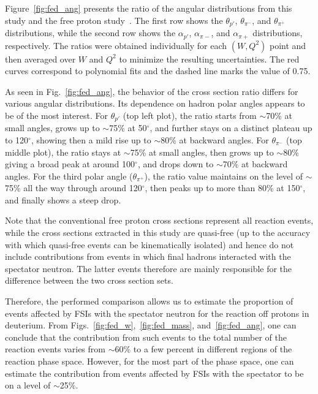 \documentclass[prc,twocolumn,superscriptaddress,showpacs,amssymb,amsmath,amsfonts,aps,nofootinbib]{revtex4-1}
\begin{document}
Figure~\ref{fig:fed_ang} presents the ratio of the angular distributions from this study and the free proton study~\cite{Fed_an_note:2017,Fed_paper_2018}. The first row shows the $\theta_{p'}$, $\theta_{\pi^{-}}$, and $\theta_{\pi^{+}}$ distributions, while the second row shows the $\alpha_{p'}$, $\alpha_{\pi{-}}$, and $\alpha_{\pi{+}}$ distributions, respectively. The ratios were obtained individually for each $(W,Q^{2})$ point and then averaged over $W$ and $Q^{2}$ to minimize the resulting uncertainties. The red curves correspond to polynomial fits and the dashed line marks the value of 0.75.

As seen in Fig.\!~\ref{fig:fed_ang}, the behavior of the cross section ratio differs for various angular distributions. Its dependence on hadron polar angles appears to be of the most interest. For $\theta_{p'}$ (top left plot), the ratio starts from $\sim$70\% at small angles, grows up to $\sim$75\% at 50$^{\circ}$, and further stays on a distinct plateau up to 120$^{\circ}$, showing then a mild rise up to $\sim$80\% at backward angles. For $\theta_{\pi^{-}}$ (top middle plot), the ratio stays at $\sim$75\% at small angles, then grows up to $\sim$80\% giving a broad peak at around 100$^{\circ}$, and drops down to $\sim$70\% at backward angles. For the third polar angle ($\theta_{\pi^{+}}$), the ratio value maintains on the level of $\sim$75\% all the way through around 120$^{\circ}$, then peaks up to more than 80\% at 150$^{\circ}$, and finally shows a steep drop.



Note that the conventional free proton cross sections represent all reaction events, while the cross sections extracted in this study are quasi-free (up to the accuracy with which quasi-free events can be kinematically isolated) and hence do not include contributions from events in which final hadrons interacted with the spectator neutron. The latter events therefore are mainly responsible for the difference between the two cross section sets. 

Therefore, the performed comparison allows us to estimate the proportion of events affected by FSIs with the spectator neutron for the reaction off protons in deuterium. From Figs.~\ref{fig:fed_w},~\ref{fig:fed_mass}, and~\ref{fig:fed_ang}, one can conclude that the contribution from such events to the total number of the reaction events varies from $\sim$60\% to a few percent in different regions of the reaction phase space. However, for the most part of the phase space, one can estimate the contribution from events affected by FSIs with the spectator to be on a level of $\sim$25\%.
\end{document}
